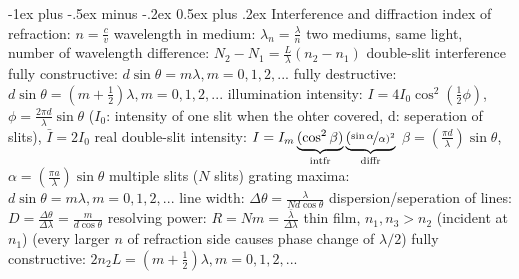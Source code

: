 \documentclass[10pt,landscape]{article}
\makeatletter
\renewcommand{\subsection}{\@startsection{subsection}{2}{0mm}%
                                {-1ex plus -.5ex minus -.2ex}%
                                {0.5ex plus .2ex}%
                                {\normalfont\normalsize\bfseries}}
\newcommand{\spc}{\hspace*{1em}}
\makeatother
\begin{document}
\begin{multicols}{3}
\subsection{Interference and diffraction}
index of refraction: $n=\frac{c}{v}$
\newline
wavelength in medium: $\lambda _n=\frac{\lambda }{n}$
\newline
two mediums, same light, number of wavelength difference: 
\newline
\spc $N_2-N_1=\frac{L}{\lambda }(n_2-n_1)$
\newline \newline
double-slit interference
\newline
\spc fully constructive: $d\sin\theta =m\lambda,m=0,1,2,...$
\newline
\spc fully destructive: $d\sin\theta =(m+\frac{1}{2})\lambda,m=0,1,2,...$
\newline
\spc illumination intensity: $I=4I_0\cos ^2(\frac{1}{2}\phi)$, $\phi=\frac{2 \pi d}{\lambda} \sin \theta $ 
\newline
\spc\spc ($I_0$: intensity of one slit when the ohter covered, d: seperation of slits), $\bar{I}=2I_0$
\newline \newline
real double-slit
\newline
\spc intensity: $I=I_m\underbrace{(\cos ^2 \beta )}_{\textrm{intfr}}\underbrace{(\nicefrac{\sin \alpha}{\alpha)^2}}_{\textrm{diffr}}$
\newline
\spc \spc $\beta =(\frac{\pi d}{\lambda })\sin \theta $, $\alpha =(\frac{\pi a}{\lambda})\sin \theta $
\newline \newline
multiple slits ($N$ slits)
\newline
\spc grating maxima: $d\sin\theta =m\lambda,m=0,1,2,...$
\newline
\spc line width: $\Delta \theta =\frac{\lambda }{Nd\cos \theta }$
\newline
\spc dispersion/seperation of lines: $D=\frac{\Delta \theta }{\Delta \lambda }=\frac{m}{d\cos \theta }$
\newline
\spc resolving power: $R=Nm=\frac{\bar{\lambda} }{\Delta \lambda }$
\newline \newline
thin film, $n_1,n_3>n_2$ (incident at $n_1$)
\newline
(every larger $n$ of refraction side causes phase change of $\lambda/2$)
\newline
\spc fully constructive: $2n_2L=(m+\frac{1}{2})\lambda ,m=0,1,2,...$

\end{multicols}
\end{document}
